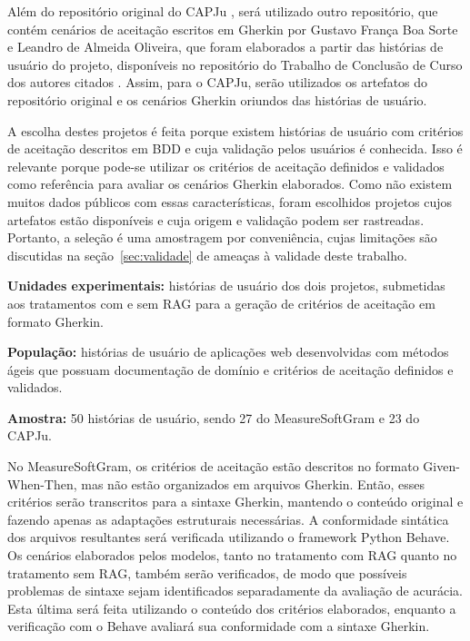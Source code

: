 Além do repositório original do CAPJu \cite{capju2023doc}, será utilizado outro repositório, que contém cenários de aceitação escritos em Gherkin por Gustavo França Boa Sorte e Leandro de Almeida Oliveira, que foram elaborados a partir das histórias de usuário do projeto, disponíveis no repositório do Trabalho de Conclusão de Curso dos autores citados \cite{capju2026cenarios} . Assim, para o CAPJu, serão utilizados os artefatos do repositório original e os cenários Gherkin oriundos das histórias de usuário.

A escolha destes projetos é feita porque existem histórias de usuário com critérios de aceitação descritos em BDD e cuja validação pelos usuários é conhecida. Isso é relevante porque pode-se utilizar os critérios de aceitação definidos e validados como referência para avaliar os cenários Gherkin elaborados. Como não existem muitos dados públicos com essas características, foram escolhidos projetos cujos artefatos estão disponíveis e cuja origem e validação podem ser rastreadas. Portanto, a seleção é uma amostragem por conveniência, cujas limitações são discutidas na seção~\ref{sec:validade} de ameaças à validade deste trabalho.

\textbf{Unidades experimentais:} histórias de usuário dos dois projetos, submetidas aos tratamentos com e sem RAG para a geração de critérios de aceitação em formato Gherkin.

\textbf{População:} histórias de usuário de aplicações web desenvolvidas com métodos ágeis que possuam documentação de domínio e critérios de aceitação definidos e validados.

\textbf{Amostra:} 50 histórias de usuário, sendo 27 do MeasureSoftGram e 23 do CAPJu.

No MeasureSoftGram, os critérios de aceitação estão descritos no formato Given-When-Then, mas não estão organizados em arquivos Gherkin. Então, esses critérios serão transcritos para a sintaxe Gherkin, mantendo o conteúdo original e fazendo apenas as adaptações estruturais necessárias. A conformidade sintática dos arquivos resultantes será verificada utilizando o framework Python Behave. Os cenários elaborados pelos modelos, tanto no tratamento com RAG quanto no tratamento sem RAG, também serão verificados, de modo que possíveis problemas de sintaxe sejam identificados separadamente da avaliação de acurácia. Esta última será feita utilizando o conteúdo dos critérios elaborados, enquanto a verificação com o Behave avaliará sua conformidade com a sintaxe Gherkin.


